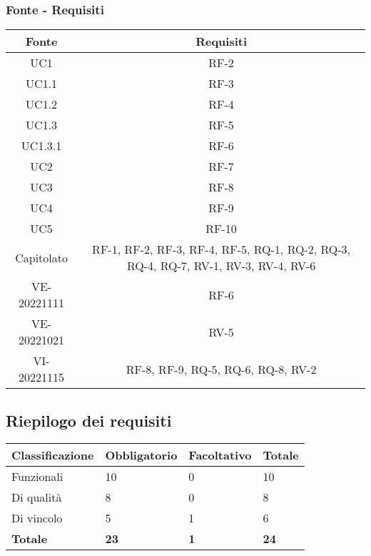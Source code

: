 \subsubsection{Fonte - Requisiti}
\begin{tabular}{| c | c |} 
 \hline
 \textbf{Fonte} & \textbf{Requisiti} \\
 \hline
	UC1 & RF-2\\
\hline
	UC1.1 & RF-3\\
\hline
	UC1.2 & RF-4\\
\hline
	UC1.3 & RF-5\\
\hline
	UC1.3.1 & RF-6\\
\hline
	UC2 & RF-7\\
\hline
	UC3 & RF-8\\
\hline
	UC4 & RF-9\\
\hline
	UC5 & RF-10\\
\hline
	Capitolato & RF-1, RF-2, RF-3, RF-4, RF-5, RQ-1, RQ-2, RQ-3, RQ-4, RQ-7, RV-1, RV-3, RV-4, RV-6\\
\hline
	VE-20221111 & RF-6\\
\hline
	VE-20221021 & RV-5\\
\hline
	VI-20221115 & RF-8, RF-9, RQ-5, RQ-6, RQ-8, RV-2\\
\hline
\end{tabular}

\subsection{Riepilogo dei requisiti}

\begin{table}[h]
	\centering
	\begin{tabular}{| p{} | p{} | p{} | p{} |} 
		\hline
		\textbf{Classificazione} & \textbf{Obbligatorio} & \textbf{Facoltativo} & \textbf{Totale} \\
		\hline
		Funzionali & 10 &  0 & 10\\
		\hline
		Di qualità & 8 & 0 & 8\\
		\hline
		Di vincolo & 5 & 1 & 6\\
		\hline
		\textbf{Totale} & \textbf{23} &\textbf {1} &  \textbf{24}\\
		\hline
	\end{tabular}
\end{table}
